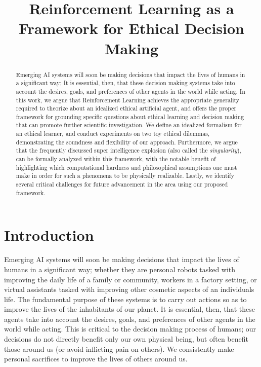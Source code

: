 \documentclass[11pt]{article}
\title{Reinforcement Learning as a Framework for Ethical Decision Making}
\author{}
\date{}                                           %
\begin{document}
\maketitle


\begin{abstract}
Emerging AI systems will soon be making decisions that impact the lives of humans in a significant way; It is essential, then, that these decision making systems take into account the desires, goals, and preferences of other agents in the world while acting.
In this work, we argue that Reinforcement Learning achieves the appropriate generality required to theorize about an idealized ethical artificial agent, and offers the proper framework for grounding specific questions about ethical learning and decision making that can promote further scientific investigation. We define an idealized formalism for an ethical learner, and conduct experiments on two toy ethical dilemmas, demonstrating the soundness and flexibility of our approach.
Furthermore, we argue that the frequently discussed super intelligence explosion (also called the {\it singularity}), can be formally analyzed within this framework, with the notable benefit of highlighting which computational hardness and philosophical assumptions one must make in order for such a phenomena to be physically realizable.
Lastly, we identify several critical challenges for future advancement in the area using our proposed framework.

\end{abstract}

\section{Introduction}



Emerging AI systems will soon be making decisions that impact the lives of humans in a significant way; whether they are personal robots tasked with improving the daily life of a family or community,  workers in a factory setting, or virtual assistants tasked with improving other cosmetic aspects of an individuals life. The fundamental purpose of these systems is to carry out actions so as to improve the lives of the inhabitants of our planet. It is essential, then, that these agents take into account the desires, goals, and preferences of other agents in the world while acting. This is critical to the decision making process of humans; our decisions do not directly benefit only our own physical being, but often benefit those around us (or avoid inflicting pain on others). We consistently make personal sacrifices to improve the lives of others around us.
\end{document}

